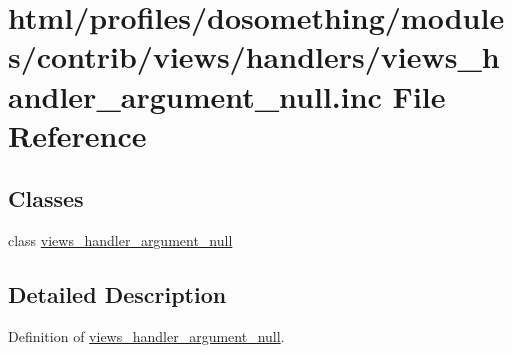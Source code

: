 \hypertarget{views__handler__argument__null_8inc}{
\section{html/profiles/dosomething/modules/contrib/views/handlers/views\_\-handler\_\-argument\_\-null.inc File Reference}
\label{views__handler__argument__null_8inc}
}
\subsection*{Classes}
\begin{DoxyCompactItemize}
\item 
class \hyperlink{classviews__handler__argument__null}{views\_\-handler\_\-argument\_\-null}
\end{DoxyCompactItemize}


\subsection{Detailed Description}
Definition of \hyperlink{classviews__handler__argument__null}{views\_\-handler\_\-argument\_\-null}. 